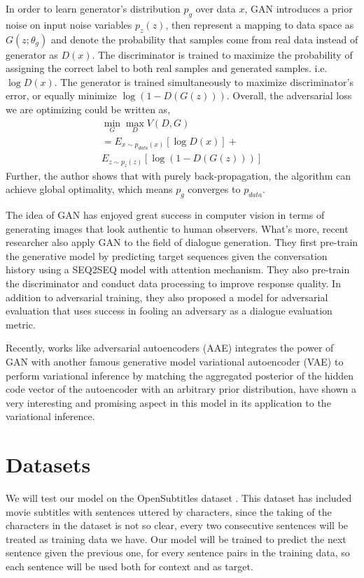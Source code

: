 \documentclass{article}
\begin{document}
In order to learn generator's distribution $p_g$ over data $x$, GAN introduces a prior noise on input noise variables $p_z(z)$, then represent a mapping to data space as $G(z;\theta_g)$ and denote the probability that samples come from real data instead of generator as $D(x)$. The discriminator is trained to maximize the probability of assigning the correct label to both real samples and generated samples. i.e. $\log D(x)$. The generator is trained simultaneously to maximize discriminator's error, or equally minimize $\log (1-D(G(z)))$. Overall, the adversarial loss we are optimizing could be written as,
\begin{align*}
\min_G \max_D V(D,G) \\
= E_{x\sim p_{data}(x)}[\log D(x)] +\\
E_{z\sim p_z(z)}[\log (1-D(G(z)))]
\end{align*}
Further, the author shows that with purely back-propagation, the algorithm can achieve global optimality, which means $p_g$ converges to $p_{data}$.

The idea of GAN has enjoyed great success in computer vision in terms of generating images that look authentic to human observers. What's more, recent researcher also apply GAN to the field of dialogue generation. They first pre-train the generative model by predicting target sequences given the conversation history using a SEQ2SEQ model with attention mechanism. They also pre-train the discriminator and conduct data processing to improve response quality. In addition to adversarial training, they also proposed a model for adversarial evaluation that uses success in fooling an adversary as a dialogue evaluation metric.

Recently, works like adversarial autoencoders (AAE) \cite{aae} integrates the power of GAN with another famous generative model variational autoencoder (VAE) to perform variational inference by matching the aggregated posterior of the hidden code vector of the autoencoder with an arbitrary prior distribution, have shown a very interesting and promising aspect in this model in its application to the variational inference.

\section{Datasets}

We will test our model on the OpenSubtitles dataset \cite{opensubtitle}. This dataset has included movie subtitles with sentences uttered by characters, since the taking of the characters in the dataset is not so clear, every two consecutive sentences will be treated as training data we have. Our model will be trained to predict the next sentence given the  previous one, for every sentence pairs in the training data, so each sentence  will be used both for context and as target.
\end{document}
